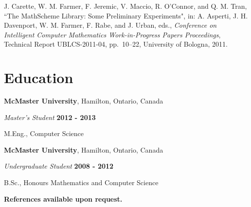 \documentclass[margin,line]{res}
\begin{document}
\begin{resume}
J. Carette, W. M. Farmer, F. Jeremic, V. Maccio, R. O'Connor, and Q. M. Tran, ``The MathScheme Library: Some
Preliminary Experiments", in: A. Asperti, J. H. Davenport, W. M. Farmer, F. Rabe, and J. Urban, eds.,
\emph{Conference on Intelligent Computer Mathematics Work-in-Progress Papers Proceedings}, Technical Report
UBLCS-2011-04, pp.~10--22, University of Bologna, 2011.

\section{\sc Education}

{\bf McMaster University}, Hamilton, Ontario, Canada

\vspace{-.3cm}

{\em Master's Student} \hfill {\bf 2012 - 2013}

\vspace{-.4cm}

M.Eng., Computer Science

{\bf McMaster University}, Hamilton, Ontario, Canada

\vspace{-.3cm}

{\em Undergraduate Student} \hfill {\bf 2008 - 2012}

\vspace{-.4cm}

B.Sc., Honours Mathematics and Computer Science

\begin{center}
\textbf{References available upon request.}
\end{center}

\end{resume}
\end{document}
